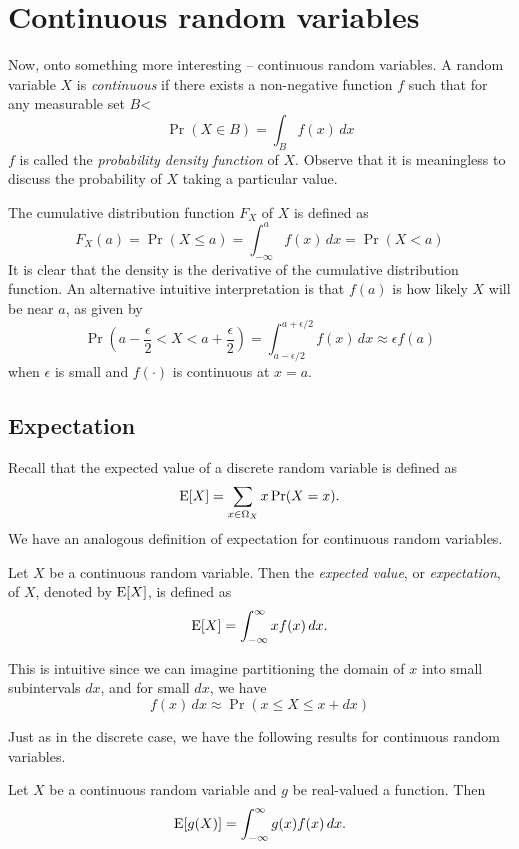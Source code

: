 \documentclass{article}
\begin{document}
\section{Continuous random variables}

Now, onto something more interesting -- continuous random variables.
A random variable $X$ is \emph{continuous} if there exists a non-negative function $f$ such that for any measurable set $B$<
\[
  \Pr(X \in B) = \int_B f(x) \, dx
\]
$f$ is called the \emph{probability density function} of $X$.
Observe that it is meaningless to discuss the probability of $X$ taking a particular value.

The cumulative distribution function $F_X$ of $X$ is defined as
\[
  F_X(a) = \Pr(X \leq a) = \int_{-\infty}^a f(x) \, dx = \Pr(X < a)
\]
It is clear that the density is the derivative of the cumulative distribution function.
An alternative intuitive interpretation is that $f(a)$ is how likely $X$ will be near $a$, as given by
\[
  \Pr(a - \dfrac{\epsilon}{2} < X < a + \dfrac{\epsilon}{2}) = \int_{a - \epsilon/2}^{a + \epsilon/2} f(x) \, dx \approx \epsilon f(a)
\]
when $\epsilon$ is small and $f(\cdot)$ is continuous at $x = a$.

\subsection{Expectation}

Recall that the expected value of a discrete random variable is defined as
\[
  \operatorname{E}[X] = \sum_{x \in \Omega_X} x \Pr(X = x).
\]
We have an analogous definition of expectation for continuous random variables.
\begin{definition}
  Let $X$ be a continuous random variable.
  Then the \emph{expected value}, or \emph{expectation}, of $X$, denoted by $\operatorname{E}[X]$, is defined as
  \[
    \operatorname{E}[X] = \int_{-\infty}^\infty x f(x) \, dx.
  \]
\end{definition}
This is intuitive since we can imagine partitioning the domain of $x$ into small subintervals $dx$, and for small $dx$, we have
\[
  f(x) \, dx \approx \Pr(x \leq X \leq x + dx)
\]

Just as in the discrete case, we have the following results for continuous random variables.

\begin{proposition}
  Let $X$ be a continuous random variable and $g$ be real-valued a function.
  Then
  \[
    \operatorname{E}[g(X)] = \int_{-\infty}^\infty g(x) f(x) \, dx.
  \]
\end{proposition}
\end{document}
